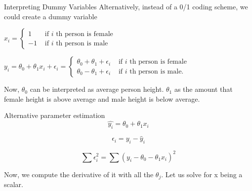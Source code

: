 \documentclass{beamer}
\begin{document}
\begin{frame}{Interpreting Dummy Variables}
Alternatively, instead of a 0/1 coding scheme, we could create a dummy variable

\pause \(x_{i}=\left\{\begin{array}{ll}{1} & {\text { if } i \text { th person is female }} \\ {-1} & {\text { if } i \text { th person is male }}\end{array}\right.\)

\pause \(y_{i}=\theta_{0}+\theta_{1} x_{i}+\epsilon_{i}=\left\{\begin{array}{ll}{\theta_{0}+\theta_{1}+\epsilon_{i}} & {\text { if } i \text { th person is female }} \\ {\theta_{0}-\theta_{1}+\epsilon_{i}} & {\text { if } i \text { th person is male. }}\end{array}\right.\)


\pause Now, $\theta_{0}$ can be interpreted as average person height. $\theta_{1}$ as the amount that female height is above average and male height is below average.
\end{frame}

%    
%    
%    
%
\begin{frame}{Alternative parameter estimation}
    $$
    \hat{y_{i}} = \theta_{0} + \theta_{1}x_{i}
    $$
    
    \pause $$
    \epsilon_{i} = y_{i} - \hat{y}_{i}
    $$
    
    \pause $$
    \sum \epsilon_{i}^{2} = \sum (y_{i} - \theta_{0} - \theta_{1}x_{i})^{2}
    $$
    
    \pause Now, we compute the derivative of it with all the  $\theta_{j}$. Let us solve for x being a scalar.
    
    
\end{frame}
\end{document}
